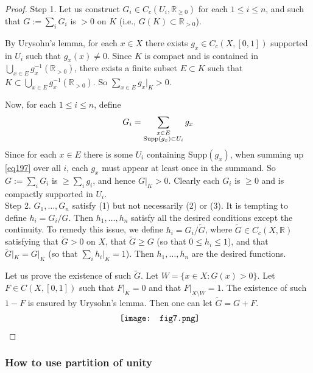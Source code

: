 \documentclass[12pt,b5paper,notitlepage]{article}
\theoremstyle{definition}
\theoremstyle{plain}
\newcommand{\wtd}{\widetilde}
\newcommand{\Rbb}{\mathbb R}
\newcommand{\Supp}{\mathrm{Supp}}
\numberwithin{equation}{section}
\begin{document}
\begin{proof}
Step 1. Let us construct $G_i\in C_c(U_i,\Rbb_{\geq0})$ for each $1\leq i\leq n$, and such that $G:=\sum_i G_i$ is $>0$ on $K$ (i.e., $G(K)\subset\Rbb_{>0}$).  

By Urysohn's lemma, for each $x\in X$ there exists $g_x\in C_c(X,[0,1])$ supported in $U_i$ such that $g_x(x)\neq 0$. Since $K$ is compact and is contained in $\bigcup_{x\in E}g_x^{-1}(\Rbb_{>0})$, there exists a finite subset $E\subset K$ such that $K\subset \bigcup_{x\in E}g_x^{-1}(\Rbb_{>0})$. So $\sum_{x\in E}g_x\big|_K>0$. 

Now, for each $1\leq i\leq n$, define
\begin{align}\label{eq197}
G_i=\sum_{
\begin{subarray}{c}
x\in E\\
\Supp(g_x)\subset U_i
\end{subarray}}
g_x
\end{align}
Since for each $x\in E$ there is some $U_i$ containing $\Supp(g_x)$, when summing up \eqref{eq197} over all $i$, each $g_x$ must appear at least once in the summand. So $G:=\sum_i G_i$ is $\geq \sum_i g_i$, and hence $G|_K>0$. Clearly each $G_i$ is $\geq0$ and is compactly supported in $U_i$. \\[-1ex]


Step 2. $G_1,\dots,G_n$ satisfy (1) but not necessarily (2) or (3). It is tempting to define $h_i=G_i/G$. Then $h_1,\dots,h_n$ satisfy all the desired conditions except the continuity. To remedy this issue, we define $h_i=G_i/\wtd G$, where $\wtd G\in C_c(X,\Rbb)$ satisfying that $\wtd G>0$ on $X$, that $\wtd G\geq G$ (so that $0\leq h_i\leq 1$), and that $\wtd G|_K=G|_K$ (so that $\sum_i h_i|_K=1$). Then $h_1,\dots,h_n$ are the desired functions.

Let us prove the existence of such $\wtd G$. Let $W=\{x\in X:G(x)>0\}$. Let $F\in C(X,[0,1])$ such that $F|_K=0$ and that $F|_{X\setminus W}=1$. The existence of such $1-F$ is ensured by Urysohn's lemma. Then one can let $\wtd G=G+F$. 
\begin{align*}
\vcenter{\hbox{{
			\texttt{[image: fig7.png]}}}}
\end{align*}
\end{proof}





\subsubsection{How to use partition of unity}\label{lb490}
\end{document}

